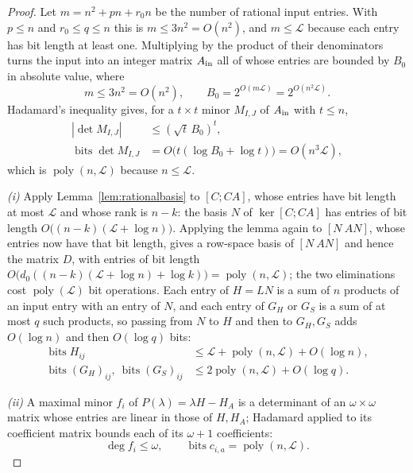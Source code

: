 \documentclass[journal]{IEEEtran}
\theoremstyle{plainn}
\theoremstyle{remark}
\begin{document}
\begin{proof}
Let $m=n^2+pn+r_0n$ be the number of rational input entries. With $p\le n$ and $r_0\le q\le n$ this
is $m\le3n^2=O(n^2)$, and $m\le\mathcal L$ because each entry has bit length at least one. Multiplying
by the product of their denominators turns the input into an integer matrix $A_{\rm in}$ all of whose
entries are bounded by $B_0$ in absolute value, where
\begin{equation*}
m\le3n^2=O(n^2),\qquad B_0=2^{O(m\mathcal L)}=2^{O(n^2\mathcal L)} .
\end{equation*}
Hadamard's inequality gives, for a $t\times t$ minor $M_{I,J}$ of $A_{\rm in}$
with $t\le n$,
\begin{equation*}
\begin{aligned}
|\det M_{I,J}|&\le(\sqrt t\,B_0)^t,\\
\operatorname{bits}\det M_{I,J}
&=O\bigl(t(\log B_0+\log t)\bigr)=O(n^3\mathcal L),
\end{aligned}
\end{equation*}
which is $\operatorname{poly}(n,\mathcal L)$ because $n\le\mathcal L$.

\emph{(i)} Apply Lemma~\ref{lem:rationalbasis} to $[C;CA]$, whose entries have bit length at most
$\mathcal L$ and whose rank is $n-k$: the basis $N$ of $\ker[C;CA]$ has entries of bit length
$O\bigl((n-k)(\mathcal L+\log n)\bigr)$. Applying the lemma again to $[N\ AN]$, whose entries now
have that bit length, gives a row-space basis of $[N\ AN]$ and hence the matrix $D$, with entries of
bit length $O\bigl(d_0((n-k)(\mathcal L+\log n)+\log k)\bigr)=\operatorname{poly}(n,\mathcal L)$;
the two eliminations cost $\operatorname{poly}(\mathcal L)$ bit operations.
Each entry of $H=LN$ is a sum of $n$ products of an input entry with an entry of
$N$, and each entry of $G_H$ or $G_S$ is a sum of at most $q$ such products, so
passing from $N$ to $H$ and then to $G_H,G_S$ adds $O(\log n)$ and then
$O(\log q)$ bits:
\begin{equation*}
\begin{aligned}
\operatorname{bits}H_{ij}&\le\mathcal L+\operatorname{poly}(n,\mathcal L)+O(\log n),\\
\operatorname{bits}(G_H)_{ij},\ \operatorname{bits}(G_S)_{ij}
&\le2\operatorname{poly}(n,\mathcal L)+O(\log q).
\end{aligned}
\end{equation*}

\emph{(ii)} A maximal minor $f_i$ of $P(\lambda)=\lambda H-H_A$ is a determinant
of an $\omega\times\omega$ matrix whose entries are linear in those of $H,H_A$;
Hadamard applied to its coefficient matrix bounds each of its $\omega+1$
coefficients:
\begin{equation*}
\deg f_i\le\omega,\qquad
\operatorname{bits}c_{i,a}=\operatorname{poly}(n,\mathcal L).
\end{equation*}


\end{proof}
\end{document}
